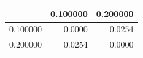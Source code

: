 \begin{tabular}{lrr}
\toprule
 & 0.100000 & 0.200000 \\
\midrule
0.100000 & 0.0000 & 0.0254 \\
0.200000 & 0.0254 & 0.0000 \\
\bottomrule
\end{tabular}
